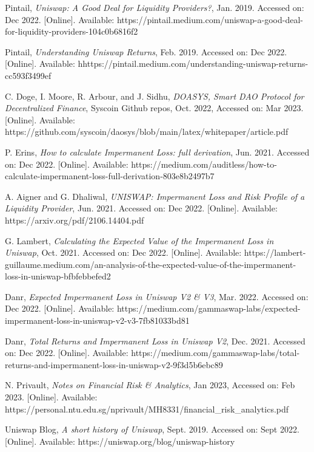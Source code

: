 \documentclass[journal,twocolumn,12pt]{ieeesyscoin}
\begin{document}
\begin{thebibliography}{00}

 Pintail, \textit{Uniswap: A Good Deal for Liquidity Providers?}, Jan. 2019. Accessed on: Dec 2022.  [Online]. Available:  https://pintail.medium.com/uniswap-a-good-deal-for-liquidity-providers-104c0b6816f2

 Pintail, \textit{Understanding Uniswap Returns}, Feb. 2019. Accessed on: Dec 2022.  [Online]. Available:  hhttps://pintail.medium.com/understanding-uniswap-returns-cc593f3499ef

 C. Doge, I. Moore, R. Arbour, and J. Sidhu, \textit{DOASYS, Smart DAO Protocol for Decentralized Finance}, Syscoin Github repos, Oct. 2022, Accessed on: Mar 2023.  [Online]. Available: https://github.com/syscoin/daosys/blob/main/latex/whitepaper/article.pdf

 P. Erins, \textit{How to calculate Impermanent Loss: full derivation}, Jun. 2021. Accessed on: Dec 2022.  [Online]. Available:  https://medium.com/auditless/how-to-calculate-impermanent-loss-full-derivation-803e8b2497b7

 A. Aigner and G. Dhaliwal, \textit{UNISWAP: Impermanent Loss and Risk Profile of a Liquidity Provider}, Jun. 2021. Accessed on: Dec 2022.  [Online]. Available:  https://arxiv.org/pdf/2106.14404.pdf

 G. Lambert, \textit{Calculating the Expected Value of the Impermanent Loss in Uniswap}, Oct. 2021. Accessed on: Dec 2022.  [Online]. Available:  https://lambert-guillaume.medium.com/an-analysis-of-the-expected-value-of-the-impermanent-loss-in-uniswap-bfbfebbefed2

 Danr, \textit{Expected Impermanent Loss in Uniswap V2 \& V3}, Mar. 2022. Accessed on: Dec 2022.  [Online]. Available:  https://medium.com/gammaswap-labs/expected-impermanent-loss-in-uniswap-v2-v3-7fb81033bd81

 Danr, \textit{Total Returns and Impermanent Loss in Uniswap V2}, Dec. 2021. Accessed on: Dec 2022.  [Online]. Available:  https://medium.com/gammaswap-labs/total-returns-and-impermanent-loss-in-uniswap-v2-9f3d5b6ebc89

 N. Privault, \textit{Notes on Financial Risk \& Analytics}, Jan 2023, Accessed on: Feb 2023.  [Online]. Available:  https://personal.ntu.edu.sg/nprivault/MH8331/financial\_risk\_analytics.pdf


 Uniswap Blog, \textit{A short history of Uniswap}, Sept. 2019. Accessed on: Sept 2022.  [Online]. Available:  https://uniswap.org/blog/uniswap-history


\end{thebibliography}
\end{document}
